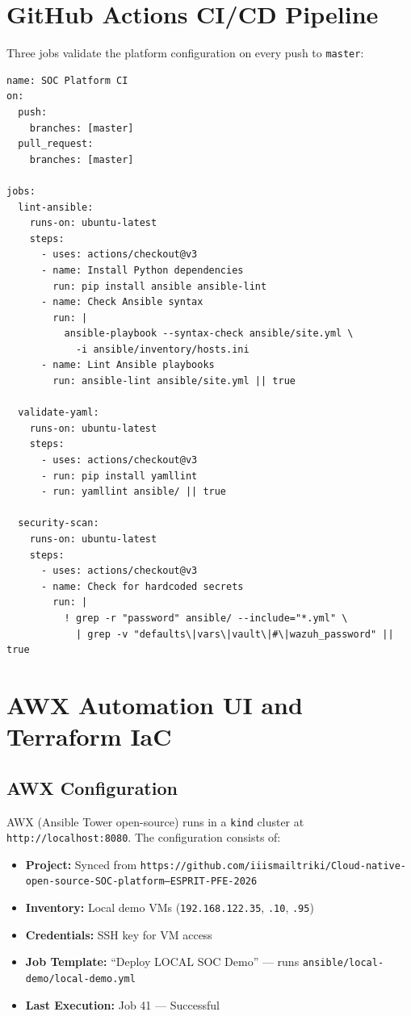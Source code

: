 \documentclass[12pt,a4paper]{report}
\begin{document}
\section{GitHub Actions CI/CD Pipeline}

Three jobs validate the platform configuration on every push to \texttt{master}:

\begin{lstlisting}[style=yamlstyle, caption=.github/workflows/ci.yml, style=yamlstyle]
name: SOC Platform CI
on:
  push:
    branches: [master]
  pull_request:
    branches: [master]

jobs:
  lint-ansible:
    runs-on: ubuntu-latest
    steps:
      - uses: actions/checkout@v3
      - name: Install Python dependencies
        run: pip install ansible ansible-lint
      - name: Check Ansible syntax
        run: |
          ansible-playbook --syntax-check ansible/site.yml \
            -i ansible/inventory/hosts.ini
      - name: Lint Ansible playbooks
        run: ansible-lint ansible/site.yml || true

  validate-yaml:
    runs-on: ubuntu-latest
    steps:
      - uses: actions/checkout@v3
      - run: pip install yamllint
      - run: yamllint ansible/ || true

  security-scan:
    runs-on: ubuntu-latest
    steps:
      - uses: actions/checkout@v3
      - name: Check for hardcoded secrets
        run: |
          ! grep -r "password" ansible/ --include="*.yml" \
            | grep -v "defaults\|vars\|vault\|#\|wazuh_password" || true
\end{lstlisting}

\section{AWX Automation UI and Terraform IaC}

\subsection{AWX Configuration}

AWX (Ansible Tower open-source) runs in a \texttt{kind} cluster at \texttt{http://localhost:8080}. The configuration consists of:

\begin{itemize}
  \item \textbf{Project:} Synced from \texttt{https://github.com/iiismailtriki/Cloud-native-open-source-SOC-platform---ESPRIT-PFE-2026}
  \item \textbf{Inventory:} Local demo VMs (\texttt{192.168.122.35}, \texttt{.10}, \texttt{.95})
  \item \textbf{Credentials:} SSH key for VM access
  \item \textbf{Job Template:} ``Deploy LOCAL SOC Demo'' --- runs \texttt{ansible/local-demo/local-demo.yml}
  \item \textbf{Last Execution:} Job 41 --- Successful
\end{itemize}
\end{document}
